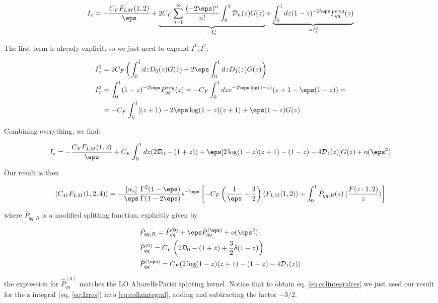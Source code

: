 \documentclass[11pt]{report}
\begin{document}
\begin{align}
    I_z = -\frac{C_F F_{LM}(1, 2)}{\eps} + \underbrace{2C_F \sum_{n=0}^{\infty}\frac{(-2\eps)^n}{n!}\int_0^1 \mathcal{D}_n(z) G(z)}_{=I_z^1} + \underbrace{\int_0^1 dz (1-z)^{-2\eps}P_{qq}^{reg}(z)}_{=I_z^2}
\end{align}

The first term is already explicit, so we just need to expand \(I_z^1, I_z^2\): 

\begin{align}
    &I_z^1 = 2C_F \left( \int_0^1 dz D_0(z) G(z)  -2\eps \int_0^1 dz D_1(z)G(z)\right) \notag \\ 
    &I_z^2 = \int_0^1 (1-z)^{-2\eps}P_{qq}^{reg}(z) = -C_F\int_0^1 dz e^{-2\eps\log(1-z)}(z+1 - \eps(1-z)) = \notag \\ 
    &\quad = -C_F\int_0^1 [(z+1) -2\eps\log(1-z)(z+1) + \eps(1-z)G(z) 
\end{align}

Combining everything, we find: 

\begin{align}
    \label{eq:Izres}
    I_z = -\frac{C_F F_{LM}(1, 2)}{\eps} + C_F \int_0^1 dz (2\mathcal{D}_0 - (1+z)) + \eps[2\log(1-z)(z+1) - (1-z) -4\mathcal{D}_1(z)]G(z) + o(\eps^2)
\end{align}

Our result is then 

\begin{align}
    \label{eq:colintegralres}
    \braket{C_{41}F_{LM}(1, 2, 4)} = -\frac{[\alpha_s]}{\eps}\frac{\Gamma^2(1-\eps)}{\Gamma(1-2\eps)}s^{-\eps}\left[-C_F \left(\frac{1}{\eps} +\frac{3}{2} \right)\braket{F_{LM}(1, 2)} + \int_0^1 \hat{P}_{qq, R}(z)\braket{\frac{F(z\cdot 1, 2)}{z}}\right]    
\end{align}

where \(\hat{P}_{qq, R}\) is a modified splitting function, explicitly given by 

\begin{align}
    &\hat{P}_{qq, R} = \hat{P}_{qq}^{(0)} + \eps \hat{P}_{qq}^{(\eps)} + o(\eps^2),  \notag \\ 
    &\hat{P}_{qq}^{(0)} = C_F\left(2\mathcal{D}_0 -(1+z) + \frac{3}{2}\delta(1-z)\right) \notag \\ 
    &\hat{P}_{qq}^{(\eps)} = C_F(2\log(1-z)(z+1)- (1-z) - 4\mathcal{D}_1(z))
\end{align}

the expression for \(\hat{P}^{(0)}_{qq}\) matches the LO Altarelli-Parisi splitting kernel. Notice that to obtain eq. \ref{eq:colintegralres} we just used our result for the z integral (eq. \ref{eq:Izres}) into \ref{eq:collzintegral}, adding and subtracting the factor \(-3/2\). 
\end{document}

